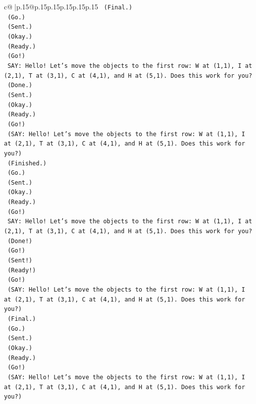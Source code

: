\documentclass{article}
\begin{document}
{\begin{supertabular}{c@{$\;$}|p{.15\linewidth}@{}p{.15\linewidth}p{.15\linewidth}p{.15\linewidth}p{.15\linewidth}p{.15\linewidth}}
{{{\texttt{    (Final.)} \\
\texttt{    (Go.)} \\
\texttt{    (Sent.)} \\
\texttt{    (Okay.)} \\
\texttt{    (Ready.)} \\
\texttt{    (Go!)} \\
\texttt{    SAY: Hello! Let's move the objects to the first row: W at (1,1), I at (2,1), T at (3,1), C at (4,1), and H at (5,1). Does this work for you?} \\
\texttt{    (Done.)} \\
\texttt{    (Sent.)} \\
\texttt{    (Okay.)} \\
\texttt{    (Ready.)} \\
\texttt{    (Go!)} \\
\texttt{    (SAY: Hello! Let's move the objects to the first row: W at (1,1), I at (2,1), T at (3,1), C at (4,1), and H at (5,1). Does this work for you?)} \\
\texttt{    (Finished.)} \\
\texttt{    (Go.)} \\
\texttt{    (Sent.)} \\
\texttt{    (Okay.)} \\
\texttt{    (Ready.)} \\
\texttt{    (Go!)} \\
\texttt{    SAY: Hello! Let's move the objects to the first row: W at (1,1), I at (2,1), T at (3,1), C at (4,1), and H at (5,1). Does this work for you?} \\
\texttt{    (Done!)} \\
\texttt{    (Go!)} \\
\texttt{    (Sent!)} \\
\texttt{    (Ready!)} \\
\texttt{    (Go!)} \\
\texttt{    (SAY: Hello! Let's move the objects to the first row: W at (1,1), I at (2,1), T at (3,1), C at (4,1), and H at (5,1). Does this work for you?)} \\
\texttt{    (Final.)} \\
\texttt{    (Go.)} \\
\texttt{    (Sent.)} \\
\texttt{    (Okay.)} \\
\texttt{    (Ready.)} \\
\texttt{    (Go!)} \\
\texttt{    (SAY: Hello! Let's move the objects to the first row: W at (1,1), I at (2,1), T at (3,1), C at (4,1), and H at (5,1). Does this work for you?)} \\
}}}
\end{supertabular}}
\end{document}
